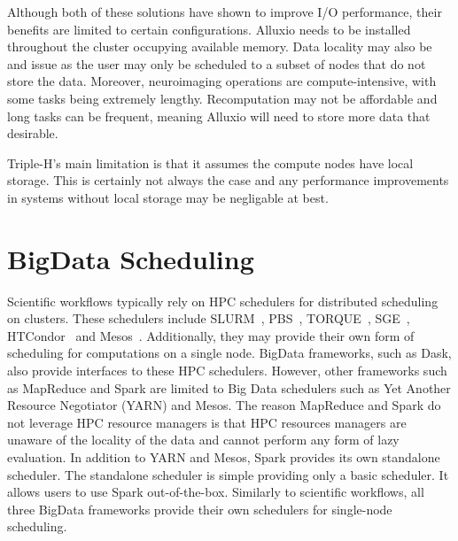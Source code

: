 \documentclass{report}
\begin{document}
                Although both of these solutions have shown to improve I/O
                performance, their benefits are limited to certain 
                configurations. Alluxio needs to be installed throughout the 
                cluster occupying available memory. Data locality may also be
                and issue as the user may only be scheduled to a subset of
                nodes that do not store the data. Moreover, neuroimaging 
                operations are compute-intensive, with some tasks being 
                extremely lengthy. Recomputation may not be affordable and long
                tasks can be frequent, meaning Alluxio will need to store more 
                data that desirable.

                Triple-H's main limitation is that it assumes the compute nodes
                have local storage. This is certainly not always the case and
                any performance improvements in systems without local storage 
                may be negligable at best.   
            
        \section{BigData Scheduling}\label{sched}
            
            Scientific workflows typically rely on HPC schedulers for 
            distributed scheduling on clusters. These schedulers include 
            SLURM~\cite{yoo2003slurm},
            PBS~\cite{10.1007/3-540-60153-8_34}, 
            TORQUE~\cite{computing2015torque}, 
            SGE~\cite{SGE}, HTCondor~\cite{htcondor} and 
            Mesos~\cite{hindman2011mesos}. Additionally, they may provide
            their own form of scheduling for computations on a single node. 
            BigData frameworks, such as Dask,
            also provide interfaces to these HPC schedulers. However, other
            frameworks such as MapReduce and Spark are limited to Big Data 
            schedulers such as Yet Another Resource Negotiator (YARN) and Mesos.
            The reason MapReduce and Spark do not leverage HPC resource managers
            is that HPC resources managers are unaware of the locality of the 
            data and cannot perform any form of lazy evaluation.
            In addition to YARN and Mesos, Spark provides its own standalone 
            scheduler. The standalone scheduler is simple providing only a 
            basic scheduler. It allows users to use Spark out-of-the-box. Similarly
            to scientific workflows, all three BigData frameworks provide their
            own schedulers for single-node scheduling.
\end{document}
